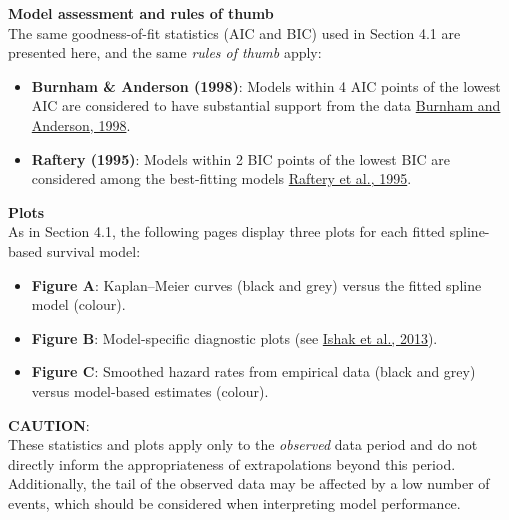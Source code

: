 \documentclass[
]{article}
\providecommand{\tightlist}{%
  \setlength{\itemsep}{0pt}\setlength{\parskip}{0pt}}
\begin{document}
\textbf{Model assessment and rules of thumb}\\
The same goodness-of-fit statistics (AIC and BIC) used in Section 4.1
are presented here, and the same \emph{rules of thumb} apply:

\begin{itemize}
\tightlist
\item
  \textbf{Burnham \& Anderson (1998)}: Models within 4 AIC points of the
  lowest AIC are considered to have substantial support from the data
  \href{https://doi.org/10.1007/978-1-4757-2917-7}{Burnham and Anderson,
  1998}.\\
\item
  \textbf{Raftery (1995)}: Models within 2 BIC points of the lowest BIC
  are considered among the best-fitting models
  \href{https://doi.org/10.2307/271063}{Raftery et al., 1995}.
\end{itemize}

\textbf{Plots}\\
As in Section 4.1, the following pages display three plots for each
fitted spline-based survival model:

\begin{itemize}
\tightlist
\item
  \textbf{Figure A}: Kaplan--Meier curves (black and grey) versus the
  fitted spline model (colour).\\
\item
  \textbf{Figure B}: Model-specific diagnostic plots (see
  \href{https://doi.org/10.1007/s40273-013-0064-3}{Ishak et al.,
  2013}).\\
\item
  \textbf{Figure C}: Smoothed hazard rates from empirical data (black
  and grey) versus model-based estimates (colour).
\end{itemize}

\textbf{CAUTION}:\\
These statistics and plots apply only to the \emph{observed} data period
and do not directly inform the appropriateness of extrapolations beyond
this period.\\
Additionally, the tail of the observed data may be affected by a low
number of events, which should be considered when interpreting model
performance.

\clearpage
\end{document}
